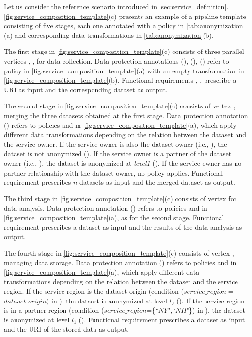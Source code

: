 \begin{example}[\bf \pipelineTemplate]\label{ex:template}
  Let us consider the reference scenario introduced in \cref{sec:service_definition}.
  {\color{OurColor}\cref{fig:service_composition_template}(c) presents an example of a pipeline template consisting of five stages, each one annotated with a policy in \cref{tab:anonymization}(a) and corresponding data transformations in \cref{tab:anonymization}(b).}

  The first stage in \cref{fig:service_composition_template}(c) consists of three parallel vertices , ,  for data collection.
  Data protection annotations \myLambda(), \myLambda(), \myLambda() refer to policy  in \cref{fig:service_composition_template}(a) with an empty transformation  in \cref{fig:service_composition_template}(b).
  Functional requirements , ,   prescribe a URI as input and the corresponding dataset as output.

  The second stage in \cref{fig:service_composition_template}(c) consists of vertex , merging the three datasets obtained at the first stage. Data protection annotation \myLambda() refers to policies  and  in \cref{fig:service_composition_template}(a), which apply different data transformations depending on the relation between the dataset and the service owner.
  If the service owner is also the dataset owner (i.e., \pone), the dataset is not anonymized (). If the service owner is a partner of the dataset owner (i.e., \ptwo), the dataset is anonymized at \emph{level1} (). If the service owner has no partner relationship with the dataset owner, no policy applies.
  Functional requirement  prescribes $n$ datasets as input and the merged dataset as output.

  The third stage in \cref{fig:service_composition_template}(c) consists of vertex   for data analysis.
  Data protection annotation \myLambda() refers to policies  and  in \cref{fig:service_composition_template}(a), as for the second stage.
  Functional requirement  prescribes a dataset as input and the results of the data analysis as output.

  The fourth stage in \cref{fig:service_composition_template}(c) consists of vertex , managing data storage. Data protection annotation \myLambda() refers to policies  and  in \cref{fig:service_composition_template}(a), which apply different data transformations depending on the relation between the dataset and the service region.
  If the service region is the dataset origin (condition $(service\_region$$=$$dataset\_origin)$ in ), the dataset is anonymized at level $l_0$ ().
  If the service region is in a partner region (condition ($service\_region$=\{``$NY$",``$NH$"\}) in ), the dataset is anonymized at level $l_1$ ().
  Functional requirement  prescribes a dataset as input and the URI of the stored data as output.


\end{example}
